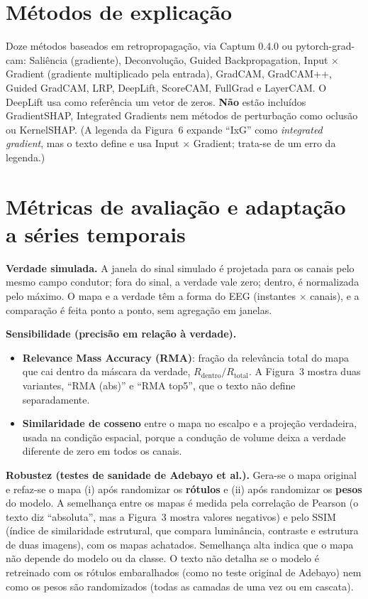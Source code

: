 \documentclass[11pt,a4paper]{article}
\begin{document}
\section{Métodos de explicação}
Doze métodos baseados em retropropagação, via Captum 0.4.0 ou pytorch-grad-cam: Saliência (gradiente), Deconvolução, Guided Backpropagation, Input $\times$ Gradient (gradiente multiplicado pela entrada), GradCAM, GradCAM++, Guided GradCAM, LRP, DeepLift, ScoreCAM, FullGrad e LayerCAM. O DeepLift usa como referência um vetor de zeros. \textbf{Não} estão incluídos GradientSHAP, Integrated Gradients nem métodos de perturbação como oclusão ou KernelSHAP. (A legenda da Figura~6 expande “IxG” como \textit{integrated gradient}, mas o texto define e usa Input $\times$ Gradient; trata-se de um erro da legenda.)

\section{Métricas de avaliação e adaptação a séries temporais}
\textbf{Verdade simulada.} A janela do sinal simulado é projetada para os canais pelo mesmo campo condutor; fora do sinal, a verdade vale zero; dentro, é normalizada pelo máximo. O mapa e a verdade têm a forma do EEG (instantes $\times$ canais), e a comparação é feita ponto a ponto, sem agregação em janelas.

\textbf{Sensibilidade (precisão em relação à verdade).}
\begin{itemize}
\item \textbf{Relevance Mass Accuracy (RMA)}: fração da relevância total do mapa que cai dentro da máscara da verdade, $R_{\text{dentro}}/R_{\text{total}}$. A Figura~3 mostra duas variantes, “RMA (abs)” e “RMA top5”, que o texto não define separadamente.
\item \textbf{Similaridade de cosseno} entre o mapa no escalpo e a projeção verdadeira, usada na condição espacial, porque a condução de volume deixa a verdade diferente de zero em todos os canais.
\end{itemize}

\textbf{Robustez (testes de sanidade de Adebayo et al.).} Gera-se o mapa original e refaz-se o mapa (i) após randomizar os \textbf{rótulos} e (ii) após randomizar os \textbf{pesos} do modelo. A semelhança entre os mapas é medida pela correlação de Pearson (o texto diz “absoluta”, mas a Figura~3 mostra valores negativos) e pelo SSIM (índice de similaridade estrutural, que compara luminância, contraste e estrutura de duas imagens), com os mapas achatados. Semelhança alta indica que o mapa não depende do modelo ou da classe. O texto não detalha se o modelo é retreinado com os rótulos embaralhados (como no teste original de Adebayo) nem como os pesos são randomizados (todas as camadas de uma vez ou em cascata).
\end{document}
